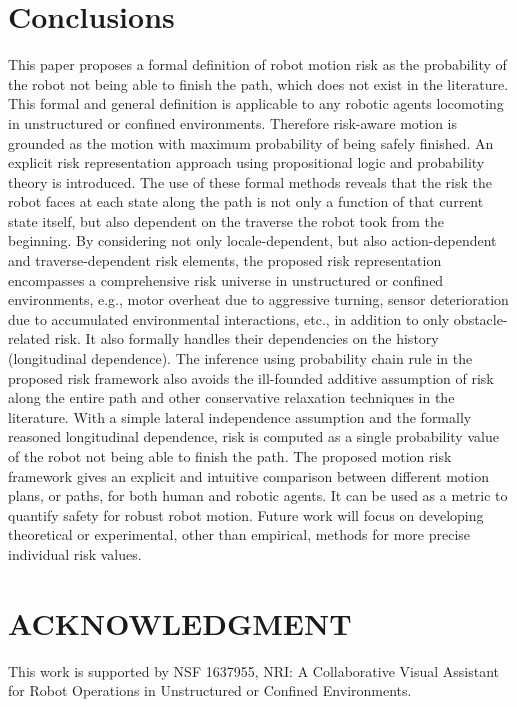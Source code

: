 \documentclass[letterpaper]{article} %
\begin{document}
\section{Conclusions}
This paper proposes a formal definition of robot motion risk as the probability of the robot not being able to finish the path, which does not exist in the literature. This formal and general definition is applicable to any robotic agents locomoting in unstructured or confined environments. Therefore risk-aware motion is grounded as the motion with maximum probability of being safely finished. An explicit risk representation approach using propositional logic and probability theory is introduced. The use of these formal methods reveals that the risk the robot faces at each state along the path is not only a function of that current state itself, but also dependent on the traverse the robot took from the beginning. By considering not only locale-dependent, but also action-dependent and traverse-dependent risk elements, the proposed risk representation encompasses a comprehensive risk universe in unstructured or confined environments, e.g., motor overheat due to aggressive turning, sensor deterioration due to accumulated environmental interactions, etc., in addition to only obstacle-related risk. It also formally handles their dependencies on the history (longitudinal dependence). The inference using probability chain rule in the proposed risk framework also avoids the ill-founded additive assumption of risk along the entire path and other conservative relaxation techniques in the literature. With a simple lateral independence assumption and the formally reasoned longitudinal dependence, risk is computed as a single probability value of the robot not being able to finish the path. The proposed motion risk framework gives an explicit and intuitive comparison between different motion plans, or paths, for both human and robotic agents. It can be used as a metric to quantify safety for robust robot motion. Future work will focus on developing theoretical or experimental, other than empirical, methods for more precise individual risk values.


\section{ACKNOWLEDGMENT}
This work is supported by NSF 1637955, NRI: A Collaborative Visual Assistant for Robot Operations in Unstructured or Confined Environments.
\end{document}

